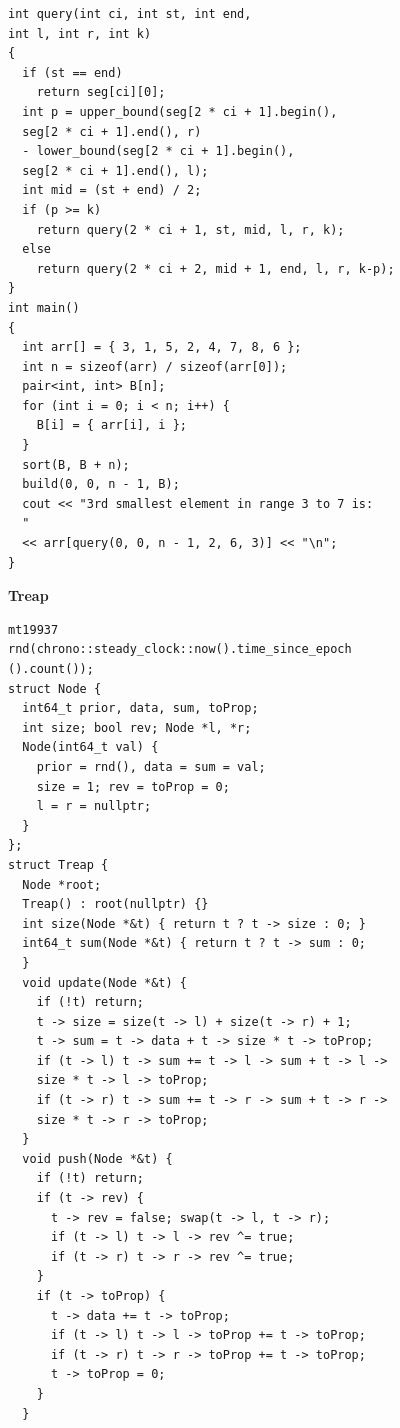 \begin{lstlisting}
int query(int ci, int st, int end,
int l, int r, int k)
{
  if (st == end)
    return seg[ci][0];
  int p = upper_bound(seg[2 * ci + 1].begin(),
  seg[2 * ci + 1].end(), r)
  - lower_bound(seg[2 * ci + 1].begin(),
  seg[2 * ci + 1].end(), l);
  int mid = (st + end) / 2;
  if (p >= k)
    return query(2 * ci + 1, st, mid, l, r, k);
  else
    return query(2 * ci + 2, mid + 1, end, l, r, k-p);
}
int main()
{
  int arr[] = { 3, 1, 5, 2, 4, 7, 8, 6 };
  int n = sizeof(arr) / sizeof(arr[0]);
  pair<int, int> B[n];
  for (int i = 0; i < n; i++) {
    B[i] = { arr[i], i };
  }
  sort(B, B + n);
  build(0, 0, n - 1, B);
  cout << "3rd smallest element in range 3 to 7 is:
  "
  << arr[query(0, 0, n - 1, 2, 6, 3)] << "\n";
}
\end{lstlisting}

\textbf{Treap}
\begin{lstlisting}
mt19937
rnd(chrono::steady_clock::now().time_since_epoch
().count());
struct Node {
  int64_t prior, data, sum, toProp;
  int size; bool rev; Node *l, *r;
  Node(int64_t val) {
    prior = rnd(), data = sum = val;
    size = 1; rev = toProp = 0;
    l = r = nullptr;
  }
};
struct Treap {
  Node *root;
  Treap() : root(nullptr) {}
  int size(Node *&t) { return t ? t -> size : 0; }
  int64_t sum(Node *&t) { return t ? t -> sum : 0;
  }
  void update(Node *&t) {
    if (!t) return;
    t -> size = size(t -> l) + size(t -> r) + 1;
    t -> sum = t -> data + t -> size * t -> toProp;
    if (t -> l) t -> sum += t -> l -> sum + t -> l ->
    size * t -> l -> toProp;
    if (t -> r) t -> sum += t -> r -> sum + t -> r ->
    size * t -> r -> toProp;
  }
  void push(Node *&t) {
    if (!t) return;
    if (t -> rev) {
      t -> rev = false; swap(t -> l, t -> r);
      if (t -> l) t -> l -> rev ^= true;
      if (t -> r) t -> r -> rev ^= true;
    }
    if (t -> toProp) {
      t -> data += t -> toProp;
      if (t -> l) t -> l -> toProp += t -> toProp;
      if (t -> r) t -> r -> toProp += t -> toProp;
      t -> toProp = 0;
    }
  }
\end{lstlisting}

\switchcolumn

